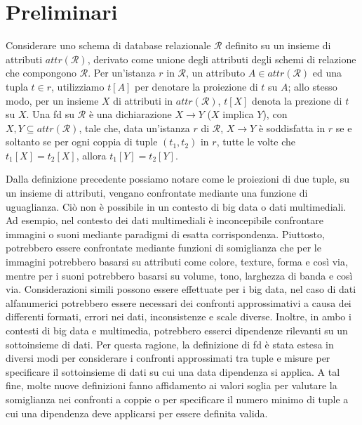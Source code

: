 \section{Preliminari} %
Considerare uno schema di database relazionale $\mathcal{R}$ definito su un insieme di attributi $attr(\mathcal{R})$, derivato come unione degli attributi degli schemi di relazione che compongono $\mathcal{R}$. Per un'istanza $r$ in $\mathcal{R}$, un attributo $A \in attr(\mathcal{R})$ ed una tupla $t \in r$, utilizziamo $t[A]$ per denotare la proiezione di $t$ su $A$; allo stesso modo, per un insieme $X$ di attributi in $attr(\mathcal{R})$, $t[X]$ denota la prezione di $t$ su $X$. Una \acrshort{fd} su $\mathcal{R}$ \`{e} una dichiarazione $X \rightarrow Y$ ($X$ implica $Y$), con $X, Y \subseteq attr(\mathcal{R})$, tale che, data un'istanza $r$ di $\mathcal{R}$, $X \rightarrow Y$ \`{e} soddisfatta in $r$ se e soltanto se per ogni coppia di tuple $(t_1, t_2)$ in $r$, tutte le volte che $t_1[X]=t_2[X]$, allora $t_1[Y]=t_2[Y]$.\par
Dalla definizione precedente possiamo notare come le proiezioni di due tuple, su un insieme di attributi, vengano confrontate mediante una funzione di uguaglianza. Ci\`{o} non \`{e} possibile in un contesto di big data o dati multimediali. Ad esempio, nel contesto dei dati multimediali \`{e} inconcepibile confrontare immagini o suoni mediante paradigmi di esatta corrispondenza. Piuttosto, potrebbero essere confrontate mediante funzioni di somiglianza che per le immagini potrebbero basarsi su attributi come colore, texture, forma e cos\`{i} via, mentre per i suoni potrebbero basarsi su volume, tono, larghezza di banda e cos\`{i} via. Considerazioni simili possono essere effettuate per i big data, nel caso di dati alfanumerici potrebbero essere necessari dei confronti approssimativi a causa dei differenti formati, errori nei dati, inconsistenze e scale diverse. Inoltre, in ambo i contesti di big data e multimedia, potrebbero esserci dipendenze rilevanti su un sottoinsieme di dati. Per questa ragione, la definizione di \acrshort{fd} \`{e} stata estesa in diversi modi per considerare i confronti approssimati tra tuple e misure per specificare il sottoinsieme di dati su cui una data dipendenza si applica. A tal fine, molte nuove definizioni fanno affidamento ai valori soglia per valutare la somiglianza nei confronti a coppie o per specificare il numero minimo di tuple a cui una dipendenza deve applicarsi per essere definita valida.

